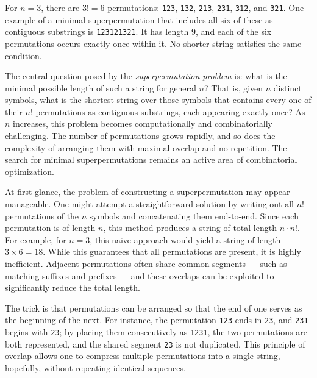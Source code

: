 For $n = 3$, there are $3! = 6$ permutations: \texttt{123}, \texttt{132}, \texttt{213}, \texttt{231}, \texttt{312}, and \texttt{321}. One example of a minimal superpermutation that includes all six of these as contiguous substrings is \texttt{123121321}. It has length 9, and each of the six permutations occurs exactly once within it. No shorter string satisfies the same condition.

The central question posed by the \emph{superpermutation problem} is: what is the minimal possible length of such a string for general $n$? That is, given $n$ distinct symbols, what is the shortest string over those symbols that contains every one of their $n!$ permutations as contiguous substrings, each appearing exactly once? As $n$ increases, this problem becomes computationally and combinatorially challenging. The number of permutations grows rapidly, and so does the complexity of arranging them with maximal overlap and no repetition. The search for minimal superpermutations remains an active area of combinatorial optimization.

At first glance, the problem of constructing a superpermutation may appear manageable. One might attempt a straightforward solution by writing out all $n!$ permutations of the $n$ symbols and concatenating them end-to-end. Since each permutation is of length $n$, this method produces a string of total length $n \cdot n!$. For example, for $n = 3$, this naive approach would yield a string of length $3 \times 6 = 18$. While this guarantees that all permutations are present, it is highly inefficient. Adjacent permutations often share common segments — such as matching suffixes and prefixes — and these overlaps can be exploited to significantly reduce the total length.

The trick is that permutations can be arranged so that the end of one serves as the beginning of the next. For instance, the permutation \texttt{123} ends in \texttt{23}, and \texttt{231} begins with \texttt{23}; by placing them consecutively as \texttt{1231}, the two permutations are both represented, and the shared segment \texttt{23} is not duplicated. This principle of overlap allows one to compress multiple permutations into a single string, hopefully, without repeating identical sequences.

